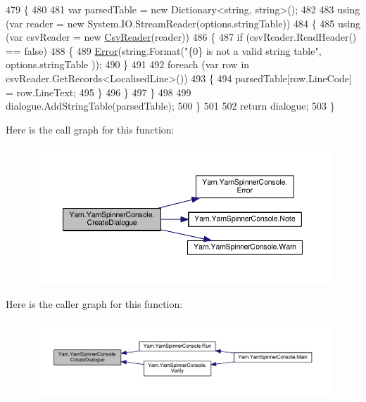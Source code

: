 \begin{DoxyCode}
479             \{
480 
481                 var parsedTable = \textcolor{keyword}{new} Dictionary<string, string>();
482 
483                 \textcolor{keyword}{using} (var reader = \textcolor{keyword}{new} System.IO.StreamReader(options.stringTable))
484                 \{
485                     \textcolor{keyword}{using} (var csvReader = \textcolor{keyword}{new} \hyperlink{a00067}{CsvReader}(reader))
486                     \{
487                         \textcolor{keywordflow}{if} (csvReader.ReadHeader() == \textcolor{keyword}{false})
488                         \{
489                             \hyperlink{a00185_a2f63f9f5b7634cb50ee75ff2eb18b137}{Error}(\textcolor{keywordtype}{string}.Format(\textcolor{stringliteral}{"\{0\} is not a valid string table"}, options.stringTable
      ));
490                         \}
491 
492                         \textcolor{keywordflow}{foreach} (var row \textcolor{keywordflow}{in} csvReader.GetRecords<LocalisedLine>())
493                         \{
494                             parsedTable[row.LineCode] = row.LineText;
495                         \}
496                     \}
497                 \}
498 
499                 dialogue.AddStringTable(parsedTable);
500             \}
501 
502             \textcolor{keywordflow}{return} dialogue;
503         \}
\end{DoxyCode}


Here is the call graph for this function\-:
\nopagebreak
\begin{figure}[H]
\begin{center}
\leavevmode
\includegraphics[width=350pt]{a00185_aab244361a510cee18ad2f636d110e0d5_cgraph}
\end{center}
\end{figure}




Here is the caller graph for this function\-:
\nopagebreak
\begin{figure}[H]
\begin{center}
\leavevmode
\includegraphics[width=350pt]{a00185_aab244361a510cee18ad2f636d110e0d5_icgraph}
\end{center}
\end{figure}


